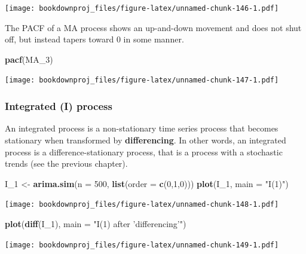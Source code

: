 \documentclass[
]{article}
\newenvironment{Shaded}{\begin{snugshade}}{\end{snugshade}}
\newcommand{\DataTypeTok}[1]{\textcolor[rgb]{0.13,0.29,0.53}{#1}}
\newcommand{\DecValTok}[1]{\textcolor[rgb]{0.00,0.00,0.81}{#1}}
\newcommand{\KeywordTok}[1]{\textcolor[rgb]{0.13,0.29,0.53}{\textbf{#1}}}
\newcommand{\NormalTok}[1]{#1}
\newcommand{\StringTok}[1]{\textcolor[rgb]{0.31,0.60,0.02}{#1}}
\begin{document}
\texttt{[image: bookdownproj\_files/figure-latex/unnamed-chunk-146-1.pdf]}

The PACF of a MA process shows an up-and-down movement and does not shut off, but instead tapers toward 0 in some manner.

\begin{Shaded}
\begin{Highlighting}[]
\KeywordTok{pacf}\NormalTok{(MA_}\DecValTok{3}\NormalTok{)}
\end{Highlighting}
\end{Shaded}

\texttt{[image: bookdownproj\_files/figure-latex/unnamed-chunk-147-1.pdf]}

\hypertarget{integrated-i-process}{%
\subsubsection{Integrated (I) process}\label{integrated-i-process}}

An integrated process is a non-stationary time series process that becomes stationary when transformed by \textbf{differencing}. In other words, an integrated process is a difference-stationary process, that is a process with a stochastic trends (see the previous chapter).

\begin{Shaded}
\begin{Highlighting}[]
\NormalTok{I_}\DecValTok{1}\NormalTok{ <-}\StringTok{ }\KeywordTok{arima.sim}\NormalTok{(}\DataTypeTok{n =} \DecValTok{500}\NormalTok{, }\KeywordTok{list}\NormalTok{(}\DataTypeTok{order =} \KeywordTok{c}\NormalTok{(}\DecValTok{0}\NormalTok{,}\DecValTok{1}\NormalTok{,}\DecValTok{0}\NormalTok{)))}
\KeywordTok{plot}\NormalTok{(I_}\DecValTok{1}\NormalTok{, }\DataTypeTok{main =} \StringTok{"I(1)"}\NormalTok{)}
\end{Highlighting}
\end{Shaded}

\texttt{[image: bookdownproj\_files/figure-latex/unnamed-chunk-148-1.pdf]}

\begin{Shaded}
\begin{Highlighting}[]
\KeywordTok{plot}\NormalTok{(}\KeywordTok{diff}\NormalTok{(I_}\DecValTok{1}\NormalTok{), }\DataTypeTok{main =} \StringTok{"I(1) after 'differencing'"}\NormalTok{)}
\end{Highlighting}
\end{Shaded}

\texttt{[image: bookdownproj\_files/figure-latex/unnamed-chunk-149-1.pdf]}
\end{document}
